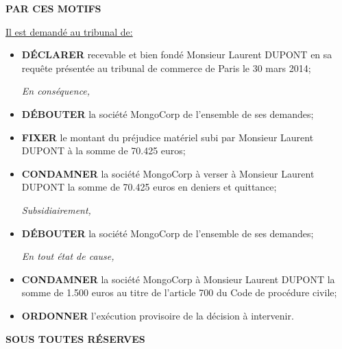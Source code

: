 \documentclass[12pt,a4paper]{article}
\begin{document}
\begin{center}
\Large{\textbf{PAR CES MOTIFS}}
\end{center}

\vspace{1cm}
\vspace{0.7cm}

\underline{Il est demandé au tribunal de:}
\vspace{0.5cm}

\begin{itemize}
\setlength\itemsep{1em}
\item \textbf{DÉCLARER} recevable et bien fondé Monsieur Laurent DUPONT en sa requête présentée au tribunal de commerce de Paris le 30 mars 2014;

\vspace{0.6cm}

\textit{En conséquence,}
\item \textbf{DÉBOUTER} la société MongoCorp de l'ensemble de ses demandes;
\item \textbf{FIXER} le montant du préjudice matériel subi par Monsieur Laurent DUPONT à la somme de 70.425 euros;
\item \textbf{CONDAMNER} la société MongoCorp à verser à Monsieur Laurent DUPONT la somme de 70.425 euros en deniers et quittance;
\vspace{0.6cm}

\textit{Subsidiairement,}
\item \textbf{DÉBOUTER} la société MongoCorp de l'ensemble de ses demandes;
\vspace{0.6cm}

\textit{En tout état de cause,}
\item \textbf{CONDAMNER} la société MongoCorp à Monsieur Laurent DUPONT la somme de 1.500 euros au titre de l'article 700 du Code de procédure civile;
\item \textbf{ORDONNER} l'exécution provisoire de la décision à intervenir.
\end{itemize}

\vspace{1.5cm}

\begin{flushright}
\small{\textbf{SOUS TOUTES RÉSERVES}}
\end{flushright}
\end{document}
